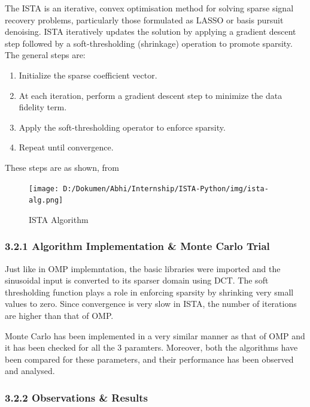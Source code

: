 \documentclass[
  letterpaper,
  DIV=11,
  numbers=noendperiod]{scrartcl}
\providecommand{\tightlist}{%
  \setlength{\itemsep}{0pt}\setlength{\parskip}{0pt}}
\begin{document}
The ISTA is an iterative, convex optimisation method for solving sparse
signal recovery problems, particularly those formulated as LASSO or
basis pursuit denoising. ISTA iteratively updates the solution by
applying a gradient descent step followed by a soft-thresholding
(shrinkage) operation to promote sparsity. The general steps are:

\begin{enumerate}
\def\labelenumi{\arabic{enumi}.}
\tightlist
\item
  Initialize the sparse coefficient vector.
\item
  At each iteration, perform a gradient descent step to minimize the
  data fidelity term.
\item
  Apply the soft-thresholding operator to enforce sparsity.
\item
  Repeat until convergence.
\end{enumerate}

These steps are as shown, from

\begin{figure}[H]

{\centering \texttt{[image: D:/Dokumen/Abhi/Internship/ISTA-Python/img/ista-alg.png]}

}

\caption{ISTA Algorithm\autocite{fast-sparse-coding}}

\end{figure}%

\subsubsection{3.2.1 Algorithm Implementation \& Monte Carlo
Trial}\label{algorithm-implementation-monte-carlo-trial}

Just like in OMP implemntation, the basic libraries were imported and
the sinusoidal input is converted to its sparser domain using DCT. The
soft thresholding function plays a role in enforcing sparsity by
shrinking very small values to zero. Since convergence is very slow in
ISTA, the number of iterations are higher than that of OMP.

Monte Carlo has been implemented in a very similar manner as that of OMP
and it has been checked for all the 3 paramters. Moreover, both the
algorithms have been compared for these parameters, and their
performance has been observed and analysed.

\subsubsection{3.2.2 Observations \&
Results}\label{observations-results-1}
\end{document}
